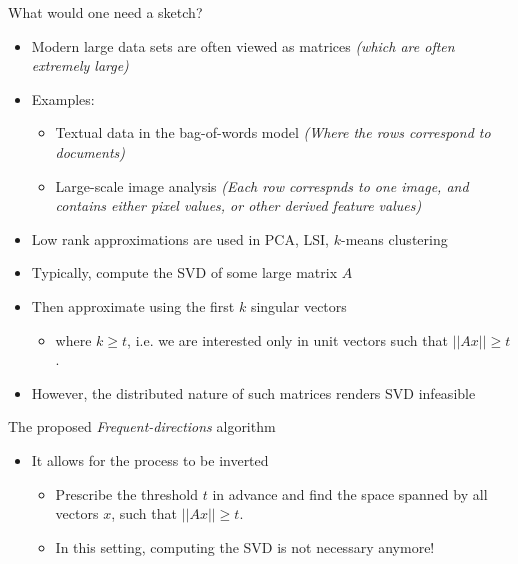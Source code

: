 \documentclass[first=dgreen,second=purple,logo=redque]{aaltoslides}
\newcommand{\vectornorm}[1]{\left|\left|#1\right|\right|}
\begin{document}
\begin{frame}[allowframebreaks=1]{What would one need a sketch?}
\begin{itemize}
  \item Modern large data sets are often viewed as matrices
   \emph{(which are often extremely large)}
  \item{Examples:}
  \begin{itemize}
    \item Textual data in the bag-of-words model \emph{(Where the rows
    correspond to documents)}
    \item Large-scale image analysis \emph{(Each row correspnds to one image,
    and contains either pixel values, or other derived feature values)}
  \end{itemize}
  \item Low rank approximations are used in PCA, LSI, $k$-means clustering
\end{itemize}

\framebreak

\begin{itemize}
  \item Typically, compute the SVD of some large matrix $A$
  \item Then approximate using the first $k$ singular vectors
  \begin{itemize}
     \item where $k \geq t$, i.e. we are interested only in unit vectors such
     that $\vectornorm{Ax} \geq t$.
  \end{itemize}
  \item However, the distributed nature of such matrices renders SVD infeasible
\end{itemize}

\end{frame}


\begin{frame}{The proposed \textit{Frequent-directions} algorithm}
\begin{itemize}
	\item It allows for the process to be inverted
	\begin{itemize}
		\item Prescribe the threshold $t$ in advance and find the space spanned by all
		vectors $x$, such that $\vectornorm{Ax} \geq t$.
	\item In this setting, computing the SVD is not necessary anymore!  
	\end{itemize} 
\end{itemize}
\end{frame}
\end{document}
